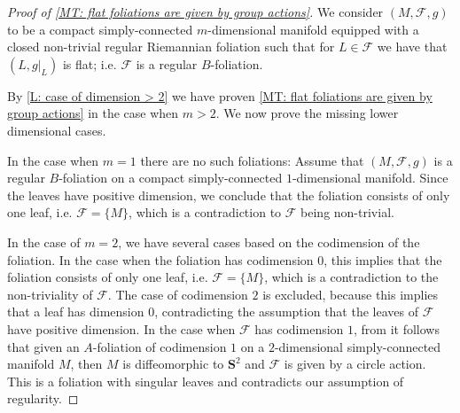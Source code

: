 \documentclass[12pt,a4paper,reqno]{amsart}
\theoremstyle{definition}
\numberwithin{equation}{section}
\newcommand{\fol}{\mathcal{F}}
\newcommand{\Sp}{\mathbf{S}} %
\begin{document}
\begin{proof}[Proof of \th\ref{MT: flat foliations are given by group actions}]
We consider $(M,\fol,g)$ to be a compact simply-connected $m$-di\-men\-sio\-nal manifold  equipped with a closed non-trivial regular Riemannian foliation such that for $L\in\fol$ we have that $(L,g|_{L})$ is flat; i.e. $\fol$ is a regular $B$-foliation. 

By \th\ref{L: case of dimension > 2} we have proven \th\ref{MT: flat foliations are given by group actions} in the case when $m>2$. We now prove the missing lower dimensional cases.

In the case when $m = 1$ there are no such foliations: Assume that $(M,\fol,g)$ is a regular $B$-foliation on a compact simply-connected $1$-dimensional manifold. Since the leaves have positive dimension, we conclude that the foliation consists of only one leaf, i.e. $\fol = \{M\}$, which is a contradiction to $\fol$ being non-trivial. 

In the case of $m = 2$, we have several cases based on the codimension of the foliation. In the case when the foliation has codimension $0$, this implies that the foliation consists of only one leaf, i.e. $\fol = \{M\}$, which is a contradiction to the non-triviality of $\fol$. The case of codimension $2$ is excluded, because this implies that a leaf has dimension $0$, contradicting the assumption that the leaves of $\fol$ have positive dimension. In the case when $\fol$ has codimension $1$, from  \cite[Theorem D]{GalazGarciaRadeschi2015} it follows that given an $A$-foliation of codimension $1$ on a $2$-dimensional simply-connected manifold $M$, then $M$ is diffeomorphic to $\Sp^2$ and $\fol$ is given by a circle action. This is a foliation with singular leaves and contradicts our assumption of regularity.
\end{proof} 







\end{document}
